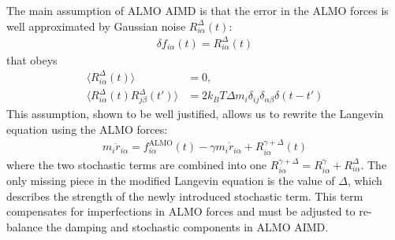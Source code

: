 \documentclass[aps,prl,reprint,amsmath,amssymb]{revtex4-1}
\begin{document}

The main assumption of ALMO AIMD is that the error in the ALMO forces is well approximated by Gaussian noise $R^{\Delta}_{i\alpha} (t)$:
%
\begin{align}
\label{eq:assumption}
\delta f_{i\alpha}(t) = R^{\Delta}_{i\alpha} (t)
\end{align}
%
that obeys
%
\begin{align}
\label{eq:stochastic2}
\langle R^{\Delta}_{i\alpha} (t) \rangle &= 0, \\
\label{eq:stochastic3}
\langle R^{\Delta}_{i\alpha} (t)  R^{\Delta}_{j\beta} (t') \rangle &= 2 k_B T \Delta m_i \delta_{ij} \delta_{\alpha\beta} \delta(t-t')
\end{align}
%
This assumption, shown to be well justified, allows us to rewrite the Langevin equation using the ALMO forces:
%
\begin{align}
\label{eq:langevin2}
m_i \ddot{r}_{i\alpha} = f^{\text{ALMO}}_{i\alpha}(t) - \gamma m_i \dot{r}_{i\alpha} + R^{\gamma + \Delta}_{i\alpha} (t)
\end{align}
%
where the two stochastic terms are combined into one $R^{\gamma + \Delta}_{i\alpha} = R^{\gamma}_{i\alpha} + R^{\Delta}_{i\alpha}$. 
The only missing piece in the modified Langevin equation is the value of $\Delta$, which describes the strength of the newly introduced stochastic term. 
This term compensates for imperfections in ALMO forces and must be adjusted to re-balance the damping and stochastic components in ALMO AIMD. %

\end{document}
